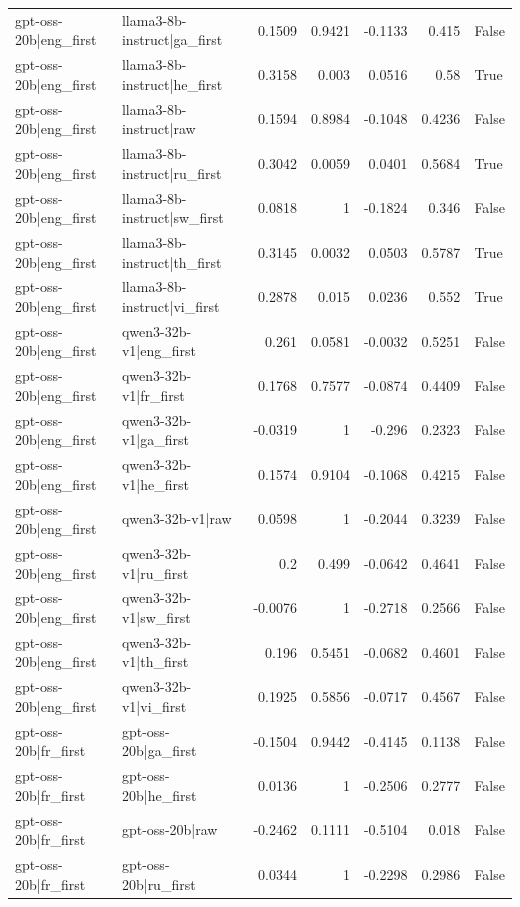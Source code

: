 \begin{table}
\begin{tabular}{l l r r r r l}
gpt-oss-20b|eng_first & llama3-8b-instruct|ga_first & 0.1509 & 0.9421 & -0.1133 & 0.415 & False \\
gpt-oss-20b|eng_first & llama3-8b-instruct|he_first & 0.3158 & 0.003 & 0.0516 & 0.58 & True \\
gpt-oss-20b|eng_first & llama3-8b-instruct|raw & 0.1594 & 0.8984 & -0.1048 & 0.4236 & False \\
gpt-oss-20b|eng_first & llama3-8b-instruct|ru_first & 0.3042 & 0.0059 & 0.0401 & 0.5684 & True \\
gpt-oss-20b|eng_first & llama3-8b-instruct|sw_first & 0.0818 & 1 & -0.1824 & 0.346 & False \\
gpt-oss-20b|eng_first & llama3-8b-instruct|th_first & 0.3145 & 0.0032 & 0.0503 & 0.5787 & True \\
gpt-oss-20b|eng_first & llama3-8b-instruct|vi_first & 0.2878 & 0.015 & 0.0236 & 0.552 & True \\
gpt-oss-20b|eng_first & qwen3-32b-v1|eng_first & 0.261 & 0.0581 & -0.0032 & 0.5251 & False \\
gpt-oss-20b|eng_first & qwen3-32b-v1|fr_first & 0.1768 & 0.7577 & -0.0874 & 0.4409 & False \\
gpt-oss-20b|eng_first & qwen3-32b-v1|ga_first & -0.0319 & 1 & -0.296 & 0.2323 & False \\
gpt-oss-20b|eng_first & qwen3-32b-v1|he_first & 0.1574 & 0.9104 & -0.1068 & 0.4215 & False \\
gpt-oss-20b|eng_first & qwen3-32b-v1|raw & 0.0598 & 1 & -0.2044 & 0.3239 & False \\
gpt-oss-20b|eng_first & qwen3-32b-v1|ru_first & 0.2 & 0.499 & -0.0642 & 0.4641 & False \\
gpt-oss-20b|eng_first & qwen3-32b-v1|sw_first & -0.0076 & 1 & -0.2718 & 0.2566 & False \\
gpt-oss-20b|eng_first & qwen3-32b-v1|th_first & 0.196 & 0.5451 & -0.0682 & 0.4601 & False \\
gpt-oss-20b|eng_first & qwen3-32b-v1|vi_first & 0.1925 & 0.5856 & -0.0717 & 0.4567 & False \\
gpt-oss-20b|fr_first & gpt-oss-20b|ga_first & -0.1504 & 0.9442 & -0.4145 & 0.1138 & False \\
gpt-oss-20b|fr_first & gpt-oss-20b|he_first & 0.0136 & 1 & -0.2506 & 0.2777 & False \\
gpt-oss-20b|fr_first & gpt-oss-20b|raw & -0.2462 & 0.1111 & -0.5104 & 0.018 & False \\
gpt-oss-20b|fr_first & gpt-oss-20b|ru_first & 0.0344 & 1 & -0.2298 & 0.2986 & False \\

\end{tabular}
\end{table}
